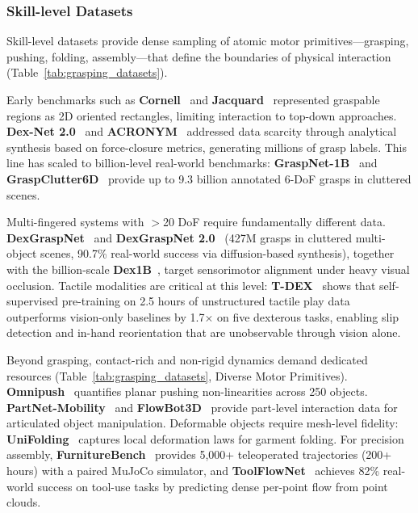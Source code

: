 \documentclass[acmsmall,screen,review,anonymous]{acmart}
\begin{document}
\subsubsection{Skill-level Datasets}\label{sec:skill_datasets_narrative}

Skill-level datasets provide dense sampling of atomic motor primitives---grasping, pushing, folding, assembly---that define the boundaries of physical interaction (Table~\ref{tab:grasping_datasets}).

Early benchmarks such as \textbf{Cornell}~\cite{lenz2014deep} and \textbf{Jacquard}~\cite{depierre2018jacquard} represented graspable regions as 2D oriented rectangles, limiting interaction to top-down approaches. \textbf{Dex-Net 2.0}~\cite{mahler2017dex} and \textbf{ACRONYM}~\cite{eppner2020acronym} addressed data scarcity through analytical synthesis based on force-closure metrics, generating millions of grasp labels. This line has scaled to billion-level real-world benchmarks: \textbf{GraspNet-1B}~\cite{fang2020graspnet} and \textbf{GraspClutter6D}~\cite{back2025graspclutter6d} provide up to 9.3 billion annotated 6-DoF grasps in cluttered scenes.

Multi-fingered systems with $>$20 DoF require fundamentally different data. \textbf{DexGraspNet}~\cite{wang2023dexgraspnetlargescaleroboticdexterous} and \textbf{DexGraspNet 2.0}~\cite{zhang2024dexgraspnet20learninggenerative} (427M grasps in cluttered multi-object scenes, 90.7\% real-world success via diffusion-based synthesis), together with the billion-scale \textbf{Dex1B}~\cite{ye2025dex1b}, target sensorimotor alignment under heavy visual occlusion. Tactile modalities are critical at this level: \textbf{T-DEX}~\cite{guzey2023tdex} shows that self-supervised pre-training on 2.5 hours of unstructured tactile play data outperforms vision-only baselines by 1.7$\times$ on five dexterous tasks, enabling slip detection and in-hand reorientation that are unobservable through vision alone.

Beyond grasping, contact-rich and non-rigid dynamics demand dedicated resources (Table~\ref{tab:grasping_datasets}, Diverse Motor Primitives). \textbf{Omnipush}~\cite{bauza2021omnipush} quantifies planar pushing non-linearities across 250 objects. \textbf{PartNet-Mobility}~\cite{xiang2020sapien} and \textbf{FlowBot3D}~\cite{flowbot3d_2022} provide part-level interaction data for articulated object manipulation. Deformable objects require mesh-level fidelity: \textbf{UniFolding}~\cite{xue2023unifolding} captures local deformation laws for garment folding. For precision assembly, \textbf{FurnitureBench}~\cite{heo2023furniturebench} provides 5,000+ teleoperated trajectories (200+ hours) with a paired MuJoCo simulator, and \textbf{ToolFlowNet}~\cite{seita2022toolflownetroboticmanipulationtools} achieves 82\% real-world success on tool-use tasks by predicting dense per-point flow from point clouds.
\end{document}
